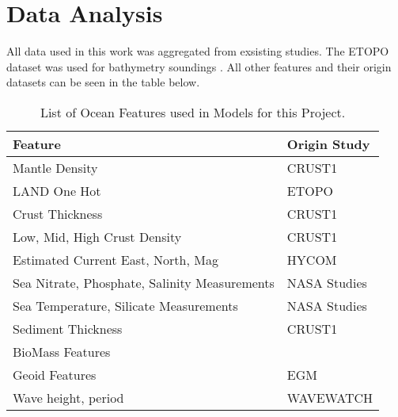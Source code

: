\section{Data Analysis}
\setlength{\parindent}{10ex}

All data used in this work was aggregated from exsisting studies.
The ETOPO dataset was used for bathymetry soundings \cite{national1988etopo}.
All other features and their origin datasets can be seen in the table below. %

%

\begin{center}
    \begin{table}[htb]
        \begin{tabular}{ |p{} p{}| }
            \hline
                \textbf{Feature} & \textbf{Origin Study} \\
                \hline
                Mantle Density & CRUST1 \cite{laske2013update} \\
                LAND One Hot & ETOPO \cite{national1988etopo} \\
                Crust Thickness & CRUST1 \cite{laske2013update} \\
                Low, Mid, High Crust Density & CRUST1 \cite{laske2013update} \\
                Estimated Current East, North, Mag & HYCOM \cite{chassignet2009us} \\
                Sea Nitrate, Phosphate, Salinity Measurements & NASA Studies \cite{meissner2018salinity} \cite{parekh2005decoupling}  \\
                Sea Temperature, Silicate Measurements & NASA Studies \\
                Sediment Thickness & CRUST1 \cite{laske2013update} \\
                BioMass Features & \cite{wei2010global} \\
                Geoid Features & EGM \cite{pavlis2008earth} \\
                Wave height, period & WAVEWATCH \cite{tolman20072007} \\
            \hline
        \end{tabular}
        \label{table:FEATURE_LIST}
        \caption{List of Ocean Features used in Models for this Project.}
    \end{table}
\end{center}
